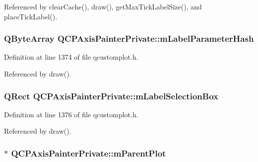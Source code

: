 Referenced by clear\+Cache(), draw(), get\+Max\+Tick\+Label\+Size(), and place\+Tick\+Label().

\hypertarget{class_q_c_p_axis_painter_private_aab8be59df22ed4e43e3a6d511cbc466a}{}
\subsubsection[{m\+Label\+Parameter\+Hash}]{\setlength{\rightskip}{0pt plus 5cm}Q\+Byte\+Array Q\+C\+P\+Axis\+Painter\+Private\+::m\+Label\+Parameter\+Hash\hspace{0.3cm}{\ttfamily [protected]}}\label{class_q_c_p_axis_painter_private_aab8be59df22ed4e43e3a6d511cbc466a}


Definition at line 1374 of file qcustomplot.\+h.



Referenced by draw().

\hypertarget{class_q_c_p_axis_painter_private_abac9a47048d537f72ca147b6f29d30f1}{}
\subsubsection[{m\+Label\+Selection\+Box}]{\setlength{\rightskip}{0pt plus 5cm}Q\+Rect Q\+C\+P\+Axis\+Painter\+Private\+::m\+Label\+Selection\+Box\hspace{0.3cm}{\ttfamily [protected]}}\label{class_q_c_p_axis_painter_private_abac9a47048d537f72ca147b6f29d30f1}


Definition at line 1376 of file qcustomplot.\+h.



Referenced by draw().

\hypertarget{class_q_c_p_axis_painter_private_a882029a5f2d4abd71289d415c9b90a28}{}
\subsubsection[{m\+Parent\+Plot}]{$\ast$ Q\+C\+P\+Axis\+Painter\+Private\+::m\+Parent\+Plot\hspace{0.3cm}{\ttfamily [protected]}}\label{class_q_c_p_axis_painter_private_a882029a5f2d4abd71289d415c9b90a28}



